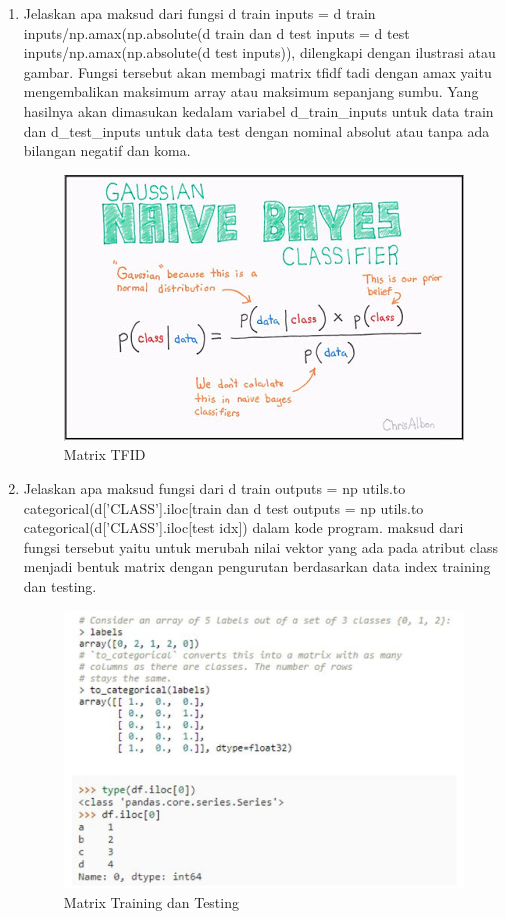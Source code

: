 \begin{enumerate}
\item Jelaskan apa maksud dari fungsi d train inputs = d train inputs/np.amax(np.absolute(d train dan d test inputs = d test inputs/np.amax(np.absolute(d test inputs)), dilengkapi dengan ilustrasi atau gambar.
\subitem Fungsi tersebut akan membagi matrix tfidf tadi dengan amax yaitu mengembalikan maksimum array atau maksimum sepanjang sumbu. Yang hasilnya akan dimasukan kedalam variabel d\_train\_inputs untuk data train dan d\_test\_inputs untuk data test dengan nominal absolut atau tanpa ada bilangan negatif dan koma.
\begin{figure}[!htbp]
	\centerline{\includegraphics[width=1\textwidth]{figures/andi/7-7.PNG}}
	\caption{Matrix TFID}
	\label{Teori}
\end{figure}

\item Jelaskan apa maksud fungsi dari d train outputs = np utils.to categorical(d['CLASS'].iloc[train dan d test outputs = np utils.to categorical(d['CLASS'].iloc[test idx]) dalam kode program.
\subitem maksud dari fungsi tersebut yaitu untuk merubah nilai vektor yang ada pada atribut class menjadi bentuk matrix dengan pengurutan berdasarkan data index training dan testing.
\begin{figure}[!htbp]
	\centerline{\includegraphics[width=1\textwidth]{figures/andi/7-8.PNG}}
	\caption{Matrix Training dan Testing}
	\label{Teori}
\end{figure}


\end{enumerate}
